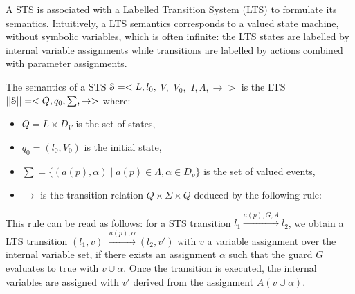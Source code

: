 A STS is associated with a Labelled Transition System (LTS) to
formulate its semantics. Intuitively, a LTS semantics corresponds
to a valued state machine, without symbolic variables, which is
often infinite: the LTS states are labelled by internal variable
assignments while transitions are labelled by actions combined
with parameter assignments.

\begin{definition}
    The semantics of a STS $\EuScript{S}=<L,l_0,$ $V,$ $V_0,$
    $I,\Lambda,\rightarrow>$ is the LTS
    $||\EuScript{S}||=<Q,q_0,\sum,\rightarrow>$ where:

	\begin{itemize}

		\item $Q=L \times D_V$ is the set of states,

        \item $q_0=(l_0,V_0)$ is the initial state,

		\item $\sum=\{(a(p),\alpha)  \mid  a(p)\in\Lambda, \alpha \in
		D_p\}$ is the set of valued events,

        \item $\rightarrow$ is the transition relation $Q \times
        \Sigma \times Q$ deduced by the following rule:\\
	\end{itemize}
	\begin{center}
	\end{center}

	\label{def:semantics}
\end{definition}

This rule can be read as follows: for a STS transition $l_1
\xrightarrow{a(p),G,A}l_2$, we obtain a LTS transition $(l_1,v)$
$\xrightarrow{a(p),\alpha} (l_2,v')$ with $v$ a variable
assignment over the internal variable set, if there exists an
assignment $\alpha$ such that the guard $G$ evaluates to true
with $v \cup \alpha$. Once the transition is executed, the
internal variables are assigned with $v'$ derived from the
assignment $A(v \cup \alpha)$.

